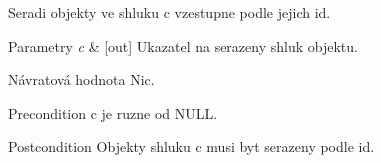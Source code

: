 Seradi objekty ve shluku \textquotesingle{}c\textquotesingle{} vzestupne podle jejich \textquotesingle{}id\textquotesingle{}.


\begin{DoxyParams}{Parametry}
{\em c} & \mbox{[}out\mbox{]} Ukazatel na serazeny shluk objektu. \\
\hline
\end{DoxyParams}
\begin{DoxyReturn}{Návratová hodnota}
Nic.
\end{DoxyReturn}
\begin{DoxyPrecond}{Precondition}
\textquotesingle{}c\textquotesingle{} je ruzne od \textquotesingle{}N\+U\+LL\textquotesingle{}. 
\end{DoxyPrecond}
\begin{DoxyPostcond}{Postcondition}
Objekty shluku \textquotesingle{}c\textquotesingle{} musi byt serazeny podle \textquotesingle{}id\textquotesingle{}. 
\end{DoxyPostcond}
